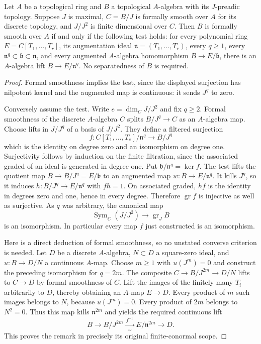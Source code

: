 \begin{proposition}\label{SA23-D-17}
Let $A$ be a topological ring and $B$ a topological $A$-algebra
with its $J$-preadic topology.  Suppose $J$ is maximal,
$C=B/J$ is formally smooth over $A$ for its discrete topology,
and $J/J^2$ is finite dimensional over $C$.
Then $B$ is formally smooth over $A$ if and only if the following
test holds: for every polynomial ring $E=C[T_1,\ldots,T_r]$,
its augmentation ideal $\mathfrak n=(T_1,\ldots,T_r)$, every
$q\geq1$, every
$\mathfrak n^q\subset\mathfrak b\subset\mathfrak n$, and every
augmented $A$-algebra homomorphism $B\to E/\mathfrak b$,
there is an $A$-algebra lift $B\to E/\mathfrak n^q$.
No separatedness of $B$ is required.
\end{proposition}
\begin{proof}
Formal smoothness implies the test, since the displayed
surjection has nilpotent kernel and the augmented map is
continuous: it sends $J^q$ to zero.

Conversely assume the test.  Write $e=\dim_C J/J^2$ and fix
$q\geq2$.  Formal smoothness of the discrete $A$-algebra $C$
splits $B/J^q\to C$ as an $A$-algebra map.  Choose lifts in
$J/J^q$ of a basis of $J/J^2$.  They define a filtered
surjection
\[
 f:C[T_1,\ldots,T_e]/\mathfrak n^q
       \longrightarrow B/J^q
\]
which is the identity on degree zero and an isomorphism
on degree one.  Surjectivity follows by induction on the
finite filtration, since the associated graded of an ideal
is generated in degree one.  Put
$\mathfrak b/\mathfrak n^q=\ker f$.
The test lifts the quotient map $B\to B/J^q=E/\mathfrak b$
to an augmented map $w:B\to E/\mathfrak n^q$.
It kills $J^q$, so it induces
$h:B/J^q\to E/\mathfrak n^q$ with $fh=1$.
On associated graded, $hf$ is the identity in degrees zero
and one, hence in every degree.  Therefore
$\operatorname{gr}f$ is injective as well as surjective.
As $q$ was arbitrary, the canonical map
\[
 \operatorname{Sym}_C(J/J^2)\longrightarrow
                    \operatorname{gr}_J B
\]
is an isomorphism.  In particular every map $f$ just
constructed is an isomorphism.

Here is a direct deduction of formal smoothness, so no
unstated converse criterion is needed.  Let $D$ be a discrete
$A$-algebra, $N\subset D$ a square-zero ideal, and
$u:B\to D/N$ a continuous $A$-map.  Choose $m\geq1$ with
$u(J^m)=0$ and construct the preceding isomorphism for
$q=2m$.  The composite $C\to B/J^{2m}\to D/N$ lifts to
$C\to D$ by formal smoothness of $C$.  Lift the images of
the finitely many $T_i$ arbitrarily to $D$, thereby obtaining
an $A$-map $E\to D$.  Every product of $m$ such images
belongs to $N$, because $u(J^m)=0$.  Every product of
$2m$ belongs to $N^2=0$.  Thus this map kills
$\mathfrak n^{2m}$ and yields the required continuous lift
\[
 B\longrightarrow B/J^{2m}
       \xrightarrow[\sim]{\,f^{-1}\,}
       E/\mathfrak n^{2m}\longrightarrow D.
\]
This proves the remark in precisely its original
finite-conormal scope.
\end{proof}
